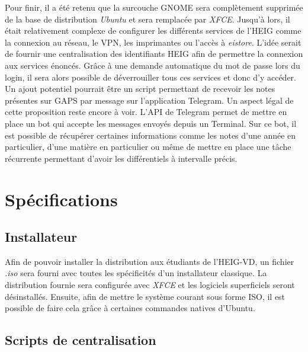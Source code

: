 Pour finir, il a été retenu que la surcouche \gls{GNOME} sera complètement supprimée de la base de distribution \textit{Ubuntu} et sera remplacée par \textit{XFCE}. 
\newline
Jusqu'à lors, il était relativement complexe de configurer les différents services de l'HEIG comme la connexion au réseau, le VPN, les imprimantes ou l'accès à \textit{eistore}.
L'idée serait de fournir une centralisation des identifiants HEIG afin de permettre la connexion aux services énoncés.
Grâce à une demande automatique du mot de passe lors du login, il sera alors possible de déverrouiller tous ces services et donc d'y accéder.
Un ajout potentiel pourrait être un script permettant de recevoir les notes présentes sur GAPS par message sur l'application Telegram.
Un aspect légal de cette proposition reste encore à voir.
L'API de Telegram permet de mettre en place un bot qui accepte les messages envoyés depuis un Terminal.
Sur ce bot, il est possible de récupérer certaines informations comme les notes d'une année en particulier, d'une matière en particulier ou même de mettre en place une tâche récurrente permettant d'avoir les différentiels à intervalle précis.


\section{Spécifications}

\subsection{Installateur}
Afin de pouvoir installer la distribution aux étudiants de l'HEIG-VD, un fichier \textit{.iso} sera fourni avec toutes les spécificités d'un installateur classique.
La distribution fournie sera configurée avec \textit{XFCE} et les logiciels superficiels seront désinstallés. 
\newline
Ensuite, afin de mettre le système courant sous forme ISO, \cite{ISO} il est possible de faire cela grâce à certaines commandes natives d'Ubuntu.


\subsection{Scripts de centralisation}

